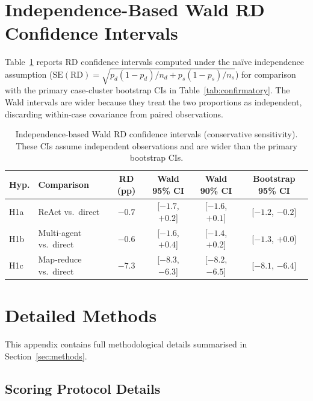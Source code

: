 \documentclass[preprint]{article}
\begin{document}
\section{Independence-Based Wald RD Confidence Intervals}
\label{app:wald-cis}

Table~\ref{tab:wald-cis} reports RD confidence intervals computed under the na\"ive independence assumption ($\text{SE}(\text{RD}) = \sqrt{p_d(1-p_d)/n_d + p_s(1-p_s)/n_s}$) for comparison with the primary case-cluster bootstrap CIs in Table~\ref{tab:confirmatory}.  The Wald intervals are wider because they treat the two proportions as independent, discarding within-case covariance from paired observations.

\begin{table}[h]
\caption{Independence-based Wald RD confidence intervals (conservative sensitivity).  These CIs assume independent observations and are wider than the primary bootstrap CIs.}
\label{tab:wald-cis}
\centering
\begin{tabular}{@{}llcccc@{}}
\toprule
\textbf{Hyp.} & \textbf{Comparison} & \textbf{RD (pp)} & \textbf{Wald 95\% CI} & \textbf{Wald 90\% CI} & \textbf{Bootstrap 95\% CI} \\
\midrule
H1a & ReAct vs.\ direct       & $-0.7$ & [$-1.7$, $+0.2$] & [$-1.6$, $+0.1$] & [$-1.2$, $-0.2$] \\
H1b & Multi-agent vs.\ direct & $-0.6$ & [$-1.6$, $+0.4$] & [$-1.4$, $+0.2$] & [$-1.3$, $+0.0$] \\
H1c & Map-reduce vs.\ direct  & $-7.3$  & [$-8.3$, $-6.3$] & [$-8.2$, $-6.5$] & [$-8.1$, $-6.4$] \\
\bottomrule
\end{tabular}
\end{table}

\section{Detailed Methods}
\label{app:detailed-methods}

This appendix contains full methodological details summarised in Section~\ref{sec:methods}.

\subsection{Scoring Protocol Details}
\end{document}
